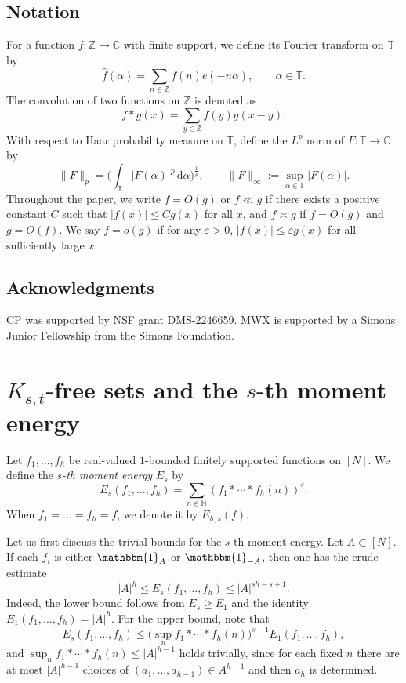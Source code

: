 \documentclass[A4paper,reqno,oneside,12pt]{amsart}
\theoremstyle{plain}
\theoremstyle{definition}
\newcommand{\e}{\mathbbm{1}}          %
\renewcommand{\d}{\,\mathrm{d}}         %
\newcommand{\Z}{\mathbb{Z}}
\newcommand{\C}{\mathbb{C}}
\newcommand{\TT}{\mathbb{T}}
\newcommand{\ee}{\varepsilon}
\begin{document}
\medskip

\subsection*{Notation}
For a function $f:\Z\to\C$ with finite support, we define its Fourier transform on $\TT$ by
\[
\widehat{f}(\alpha) = \sum_{n\in\Z} f(n)e(-n\alpha),
\qquad \alpha\in\TT.
\] 
The convolution of two functions on $\Z$ is denoted as
\[
f*g(x) = \sum_{y\in\Z} f(y)g(x-y).
\]
With respect to Haar probability measure on $\TT$, define the $L^p$ norm of $F:\TT\to\C$ by 
\[
\|F\|_{p} =  \Big(\int_{\TT}|F(\alpha)|^{p} \d\alpha \Big)^{\frac{1}{p}},
\qquad
\|F\|_{\infty}:= \sup_{\alpha \in \TT} |F(\alpha)|.
\]
Throughout the paper, we write $f=O(g)$ or $f\ll g$ if there exists a positive constant $C$ such that $|f(x)|\le C g(x)$ for all $x$, and $f\asymp g$ if $f=O(g)$ and $g=O(f)$. We say $f= o(g)$ if for any $\ee>0$, $|f(x)|\le \ee g(x)$ for all sufficiently large $x$.

\medskip

\subsection*{Acknowledgments} CP was supported by NSF grant DMS-2246659. MWX is supported by a Simons Junior Fellowship from the Simons Foundation.  

\section{$K_{s,t}$-free sets and the $s$-th moment energy}\label{sec:energy}

Let $f_1,\dots,f_h$ be real-valued $1$-bounded finitely supported functions on $[N]$. We define the \emph{$s$-th moment energy} $E_{s}$ by
\[
E_{s}(f_1,\dots,f_h)=\sum_{n\in \mathbb{N}}(f_1*\cdots *f_h(n))^s.
\]
When $f_1=\dots=f_h=f$, we denote it by $E_{h,s}(f)$. 

Let us first discuss the trivial bounds for the $s$-th moment energy.  Let $A\subset [N]$.
If each $f_i$ is either $\e_A$ or $\e_{-A}$, then one has the crude estimate
\[
|A|^{h} \le E_{s}(f_1,\dots,f_h)\le |A|^{sh-s+1}.
\]
Indeed, the lower bound follows from $E_s\ge E_1$ and the identity $E_1(f_1,\dots,f_h)=|A|^h$. For the upper bound, note that
\[
E_{s}(f_1,\dots,f_h)\leq \Big(\sup_n f_1*\cdots * f_h(n)\Big)^{s-1}E_{1}(f_1,\dots,f_h),
\]
and $\sup_n f_1*\cdots * f_h(n)\le |A|^{h-1}$ holds trivially, since for each fixed $n$ there are at most $|A|^{h-1}$ choices of $(a_1,\dots,a_{h-1})\in A^{h-1}$ and then $a_h$ is determined.
\end{document}
